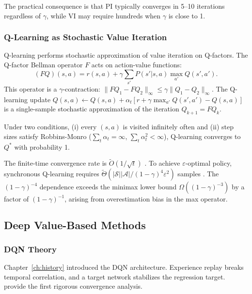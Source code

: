 The practical consequence is that PI typically converges in 5--10 iterations regardless of $\gamma$, while VI may require hundreds when $\gamma$ is close to 1.


\subsubsection{Q-Learning as Stochastic Value Iteration}

Q-learning \citep{WatkinsDayan1992} performs stochastic approximation of value iteration on Q-factors. The Q-factor Bellman operator $F$ acts on action-value functions:
\begin{equation}
(FQ)(s,a) = r(s,a) + \gamma \sum_{s'} P(s'|s,a) \max_{a'} Q(s',a').
\end{equation}
This operator is a $\gamma$-contraction: $\|FQ_1 - FQ_2\|_\infty \leq \gamma \|Q_1 - Q_2\|_\infty$. The Q-learning update $Q(s,a) \leftarrow Q(s,a) + \alpha_t [r + \gamma \max_{a'} Q(s',a') - Q(s,a)]$ is a single-sample stochastic approximation of the iteration $Q_{k+1} = FQ_k$.

\begin{theorem}
\label{thm:q_convergence}
Under two conditions, (i) every $(s,a)$ is visited infinitely often and (ii) step sizes satisfy Robbins-Monro ($\sum_t \alpha_t = \infty$, $\sum_t \alpha_t^2 < \infty$), Q-learning converges to $Q^*$ with probability 1.
\end{theorem}

The finite-time convergence rate is $\tilde{O}(1/\sqrt{t})$ \citep{evendar2003}. To achieve $\varepsilon$-optimal policy, synchronous Q-learning requires $\tilde{\Theta}(|\mathcal{S}||\mathcal{A}|/(1-\gamma)^4\varepsilon^2)$ samples \citep{li2024minimax}. The $(1-\gamma)^{-4}$ dependence exceeds the minimax lower bound $\Omega((1-\gamma)^{-3})$ by a factor of $(1-\gamma)^{-1}$, arising from overestimation bias in the max operator.


\subsection{Deep Value-Based Methods}
\label{sec:deep_value}

\subsubsection{DQN Theory}

Chapter~\ref{ch:history} introduced the DQN architecture. Experience replay breaks temporal correlation, and a target network stabilizes the regression target. \citet{fan2020dqn} provide the first rigorous convergence analysis.

